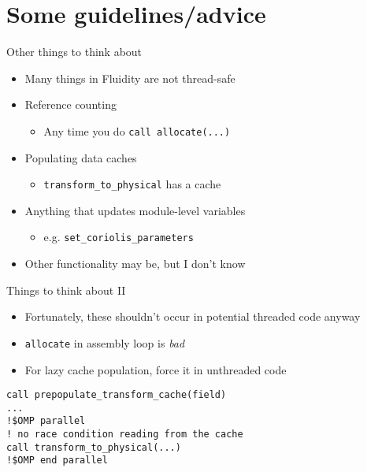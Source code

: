 \documentclass[bigger]{beamer}
\begin{document}
\section{Some guidelines/advice}
\label{sec:orgheadline39}
\begin{frame}[fragile,label={sec:orgheadline33}]{Other things to think about}
 \begin{itemize}
\item Many things in Fluidity are not thread-safe
\item Reference counting
\begin{itemize}
\item Any time you do \texttt{call allocate(...)}
\end{itemize}
\item Populating data caches
\begin{itemize}
\item \texttt{transform\_to\_physical} has a cache
\end{itemize}
\item Anything that updates module-level variables
\begin{itemize}
\item e.g. \texttt{set\_coriolis\_parameters}
\end{itemize}
\item Other functionality may be, but I don't know
\end{itemize}
\end{frame}

\begin{frame}[fragile,label={sec:orgheadline34}]{Things to think about II}
 \begin{itemize}
\item Fortunately, these shouldn't occur in potential threaded code anyway
\item \texttt{allocate} in assembly loop is \emph{bad}
\item For lazy cache population, force it in unthreaded code
\end{itemize}

\begin{verbatim}
call prepopulate_transform_cache(field)
...
!$OMP parallel
! no race condition reading from the cache
call transform_to_physical(...)
!$OMP end parallel
\end{verbatim}
\end{frame}
\end{document}
